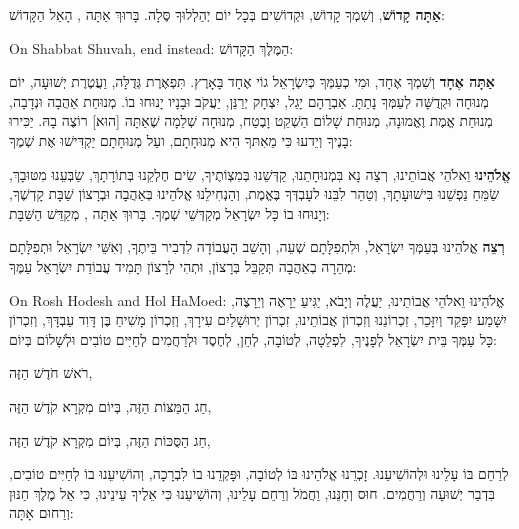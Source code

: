 \textbf{אַתָּה קָדוֹשׁ}, וְשִׁמְךָ קָדוֹשׁ, וּקְדוֹשִׁים בְּכָל יוֹם יְהַלְלוּךָ סֶּלָה. בָּרוּךְ אַתָּה \Shem{}, הָאֵל הַקָּדוֹשׁ:

\begin{seasonal}{On Shabbat Shuvah, end instead:}
הַמֶּלֶךְ הַקָּדוֹשׁ:
\end{seasonal}



\textbf{אַתָּה אֶחָד} וְשִׁמְךָ אֶחָד, וּמִי כְעַמְּךָ כְּיִשְׂרָאֵל גוֹי אֶחָד בָּאָרֶץ. תִּפְאֶרֶת גְּדֻלָּה, וַעֲטֶרֶת יְשׁוּעָה, יוֹם מְנוּחָה וּקְדֻשָּׁה לְעַמְּךָ נָתַתָּ. אַבְרָהָם יָגֵל, יִצְחָק יְרַנֵּן, יַעֲקֹב וּבָנָיו יָנוּחוּ בוֹ. מְנוּחַת אַהֲבָה וּנְדָבָה, מְנוּחַת אֱמֶת וֶאֱמוּנָה, מְנוּחַת שָׁלוֹם הַשְׁקֵט וָבֶטַח, מְנוּחָה שְׁלֵמָה שֶׁאַתָּה [הוּא] רוֹצֶה בָהּ. יַכִּירוּ בָנֶיךָ וְיֵדעוּ כִּי מֵאִתּךָ הִיא מְנוּחָתָם, ועַל מְנוּחָתָם יַקְדִּישׁוּ אֶת שְׁמֶךָ:

\textbf{אֱלֹהֵינוּ} וֵאלֹהֵי אֲבוֹתֵינוּ, רְצֵה נָא בִּמְנוּחָתֵנוּ, קַדְּשֵׁנוּ בְּמִצְוֹתֶיךָ, שִׂים חֶלְקֵנוּ בְּתוֹרָתָךְ, שַׂבְּעֵנוּ מִטּוּבָךְ, שַׂמֵּחַ נַפְשֵׁנוּ בִּישׁוּעָתָךְ, וְטַהֵר לִבֵּנוּ לעָבְדְּךָ בֶּאֱמֶת, וְהַנְחִילֵנוּ \Shem{} אֱלֹהֵינוּ בְּאַהֲבָה וּבְרָצוֹן שַׁבָּת קָדְשֶׁךָ, וְיָנוּחוּ בוֹ כָּל יִשְׂרָאֵל מְקַדְּשֵׁי שְׁמֶךָ. בָּרוּךְ אַתָּה \Shem{}, מְקַדֵּשׁ הַשַּׁבָּת:

\textbf{רְצֵה} \Shem{} אֱלֹהֵינוּ בְּעַמְּךָ יִשְׂרָאֵל, וּלִתְפִלָּתָם שְׁעֵה, וְהָשֵׁב הָעֲבוֹדָה לִדְבִיר בֵּיתֶךָ, וְאִשֵּׁי יִשְׂרָאֵל וּתְפִלָּתָם מְהֵרָה בְאַהֲבָה תְּקַבֵּל בְּרָצוֹן, וּתְהִי לְרָצוֹן תָּמִיד עֲבוֹדַת יִשְׂרָאֵל עַמֶּךָ:

\begin{seasonal}{On Rosh Hodesh and Hol HaMoed:}
אֱלֹהֵינוּ וֵאלֹהֵי אֲבוֹתֵינוּ, יַעֲלֶה וְיָבֹא, יַגִּיעַ יֵרָאֶה וְיֵרָצֶה, יִשָּׁמַע יִפָּקֵד וְיִזָּכֵר, זִכְרוֹנֵנוּ וְזִכְרוֹן אֲבוֹתֵינוּ, זִכְרוֹן יְרוּשָׁלַיִם עִירָךְ, וְזִכְרוֹן מָשִׁיחַ בֶּן דָּוִד עַבְדָּךְ, וְזִכְרוֹן כָּל עַמְּךָ בֵּית יִשְׂרָאֵל לְפָנֶיךָ, לִפְלֵטָה, לְטוֹבָה, לְחֵן, לְחֶסֶד וּלְרַחֲמִים לְחַיִּים טוֹבִים וּלְשָׁלוֹם בְּיוֹם:

רֹאשׁ חֹדֶשׁ הַזֶּה,

חַג הַמַּצּוֹת הַזֶּה, בְּיוֹם מִקְרָא קֹדֶשׁ הַזֶּה,

חַג הַסֻּכּוֹת הַזֶּה, בְּיוֹם מִקְרָא קֹדֶשׁ הַזֶּה,

לְרַחֵם בּוֹ עָלֵינוּ וּלְהוֹשִׁיעֵנוּ. זָכְרֵנוּ \Shem{} אֱלֹהֵינוּ בּוֹ לְטוֹבָה, וּפָּקְדֵנוּ בוֹ לִבְרָכָה, וְהוֹשִׁיעֵנוּ בוֹ לְחַיִּים טוֹבִים, בִּדְבַר יְשׁוּעָה וְרַחֲמִים. חוּס וְחָנֵּנוּ, וַחֲמֹל וְרַחֵם עָלֵינוּ, וְהוֹשִׁיעֵנוּ כִּי אֵלֶיךָ עֵינֵינוּ, כִּי אֵל מֶלֶךְ חַנּוּן וְרַחוּם אָתָּה:
\end{seasonal}

